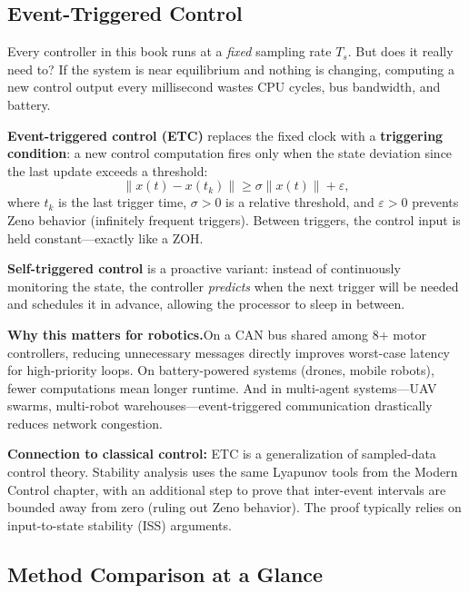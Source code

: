 \subsection{Event-Triggered Control}

Every controller in this book runs at a \emph{fixed} sampling rate $T_s$. But does it really need to? If the system is near equilibrium and nothing is changing, computing a new control output every millisecond wastes CPU cycles, bus bandwidth, and battery.

\textbf{Event-triggered control (ETC)} replaces the fixed clock with a \textbf{triggering condition}: a new control computation fires only when the state deviation since the last update exceeds a threshold:
\[
\|x(t) - x(t_k)\| \geq \sigma \|x(t)\| + \varepsilon,
\]
where $t_k$ is the last trigger time, $\sigma > 0$ is a relative threshold, and $\varepsilon > 0$ prevents Zeno behavior (infinitely frequent triggers). Between triggers, the control input is held constant---exactly like a ZOH.

\textbf{Self-triggered control} is a proactive variant: instead of continuously monitoring the state, the controller \emph{predicts} when the next trigger will be needed and schedules it in advance, allowing the processor to sleep in between.

\textbf{Why this matters for robotics.}\;On a CAN bus shared among 8+ motor controllers, reducing unnecessary messages directly improves worst-case latency for high-priority loops. On battery-powered systems (drones, mobile robots), fewer computations mean longer runtime. And in multi-agent systems---UAV swarms, multi-robot warehouses---event-triggered communication drastically reduces network congestion.

\textbf{Connection to classical control:} ETC is a generalization of sampled-data control theory. Stability analysis uses the same Lyapunov tools from the Modern Control chapter, with an additional step to prove that inter-event intervals are bounded away from zero (ruling out Zeno behavior). The proof typically relies on input-to-state stability (ISS) arguments.

\subsection{Method Comparison at a Glance}

